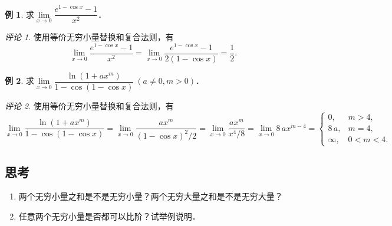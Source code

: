 \documentclass[a4paper,punct=CCT]{ctexbook}
\theoremstyle{definition}
\newtheorem*{example*}{例}
\theoremstyle{remark}
\newtheorem*{remark}{评论}
\newif\ifshowsolp
\begin{document}
\begin{example*}
  求\(\lim\limits_{x\to0} \dfrac{e^{1-\cos x}-1}{x^2}\)．\rule[-2ex]{0ex}{3.5ex}

  \begin{remark}
    使用等价无穷小量替换和复合法则，有
    \begin{equation*}
      \lim_{x\to0} \frac{e^{1-\cos x}-1}{x^2}
      = \lim_{x\to0} \frac{e^{1-\cos x}-1}{2(1-\cos x)}
      = \frac12.
    \end{equation*}
  \end{remark}
\end{example*}

\begin{example*}
  求\(\lim\limits_{x\to0} \dfrac{\ln(1+ax^m)}{1-\cos(1-\cos x)}\ (a \ne 0, m > 0)\)．\rule[-2ex]{0ex}{3.5ex}

  \begin{remark}
    使用等价无穷小量替换和复合法则，有
    \begin{equation*}
      \lim_{x\to0} \frac{\ln(1+ax^m)}{1-\cos(1-\cos x)}
      = \lim_{x\to0} \frac{ax^m}{(1-\cos x)^2\!/2}
      = \lim_{x\to0} \frac{ax^m}{x^4\!/8}
      = \lim_{x\to0} 8\,ax^{m-4} =
      \begin{cases}
        0, & m > 4, \\
        8\,a, & m = 4, \\
        \infty, & 0 < m < 4.
      \end{cases}
    \end{equation*}
  \end{remark}
\end{example*}

\subsection*{思考}

\begin{enumerate}
\item 两个无穷小量之和是不是无穷小量？两个无穷大量之和是不是无穷大量？

  \ifshowsolp
  是．不是．前者可由极限的加法法则得出．后者可以构造反例，函数\(f(x) = x,\ g(x) = -x\)．这里的\(f\)和\(g\)在无穷处都是无穷大量，但是\(f+g\)是常函数．
  \fi

\item 任意两个无穷小量是否都可以比阶？试举例说明．

  \ifshowsolp
  不一定．例如，函数\(x \sin\frac1x\)和\(x\)在原点处都是无穷小量，但是它们的商发散．
  \fi
\end{enumerate}
\end{document}
